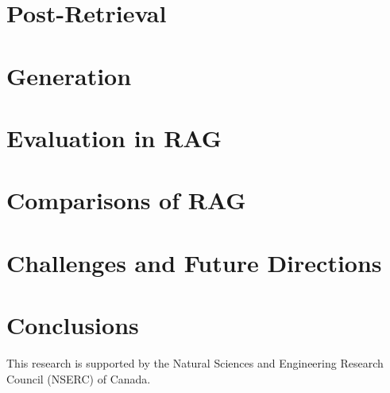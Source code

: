 \documentclass[acmsmall, table]{acmart}
\begin{document}
\section{Post-Retrieval}
\label{sec:postretrieval}


\section{Generation}
\label{sec:generation}


\section{Evaluation in RAG}
\label{sec:evaluation}


\section{Comparisons of RAG}
\label{sec:compare}


\section{Challenges and Future Directions}
\label{sec:future}


\section{Conclusions}
\label{sec:conclusions}


\begin{acks}
This research is supported by the Natural Sciences and Engineering Research Council (NSERC) of Canada.
\end{acks}



\end{document}
